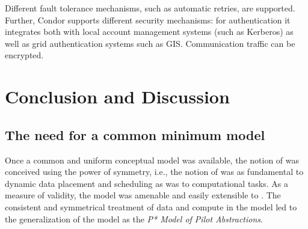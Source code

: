 \documentclass{sig-alternate}
\begin{document}
Different fault tolerance mechanisms, such as automatic retries, are
supported.  Further, Condor supports different security mechanisms:
for authentication it integrates both with local account management
systems (such as Kerberos) as well as grid authentication systems such
as GIS. Communication traffic can be encrypted.


% 


\section{Conclusion and Discussion}

\subsection{The need for a common minimum model}


Once a common and uniform conceptual model was available, the notion
of \pilotdata was conceived using the power of symmetry, i.e., the
notion of \pilotdata was as fundamental to dynamic data placement and
scheduling as \pilotjobs was to computational tasks. As a measure of
validity, the \pstar model was amenable and easily extensible to
\pilotdata.  The consistent and symmetrical treatment of data and
compute in the model led to the generalization of the model as the
{\it P* Model of Pilot Abstractions}.
\end{document}
